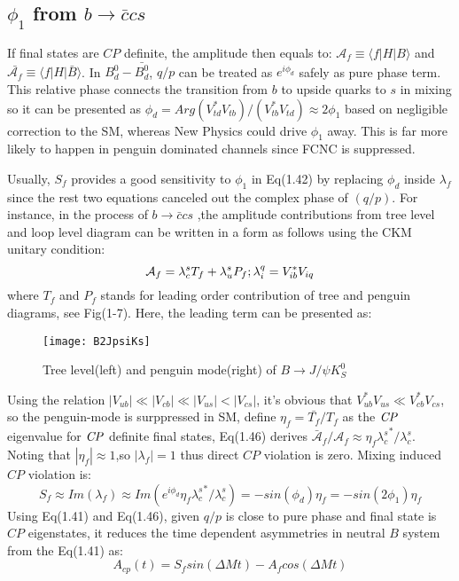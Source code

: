 \subsection{$\phi_1$  from $b\to \bar{c}cs$}
If final states are $CP$ definite, the amplitude then equals to: $\mathcal{A}_f \equiv \langle f|H|B\rangle$ and $\bar{\mathcal{A}_f} \equiv \langle f|H|\bar{B}\rangle$. In $B_d^0-\bar{B_d^0}$, $q/p$ can be treated as $e^{i\phi_d}$ safely as pure phase term. This relative phase connects the transition from $b$ to upside quarks to $s$ in mixing so it can be presented as $\phi_d = Arg(V^*_{td}V_{tb})/(V^*_{tb}V_{td}) \approx 2\phi_1 $ based on negligible correction to the SM, whereas New Physics could drive $\phi_1$ away. This is far more likely to happen in penguin dominated channels since FCNC is suppressed.

Usually, $S_f$ provides a good sensitivity to $\phi_1$ in Eq(1.42) by replacing $\phi_d$ inside $\lambda_f$ since the rest two equations canceled out the complex phase of $(q/p)$. For instance, in the process of  $b\to \bar{c}cs$ ,the amplitude contributions from tree level and loop level diagram can be written in a form as follows using the CKM unitary condition: 
\begin{equation}
\mathcal{A}_f= 
\lambda^s_c T_f + 
\lambda^s_u P_f; \\
\lambda^q_i = V^*_{ib}V_{iq}
\end{equation}
where $T_f$ and $P_f$ stands for leading order contribution of tree and penguin diagrams, see Fig(1-7). Here, the leading term can be presented as: 
\begin{figure}[htpb]
	\centering
	\texttt{[image: B2JpsiKs]}
	\caption{Tree level(left) and penguin mode(right) of $B\to J/\psi K_S^0$}
\end{figure}

Using the relation $|V_{ub}|\ll |V_{cb}|\ll|V_{us}|<|V_{cs}|$, it's obvious that $V^*_{ub}V_{us} \ll V^*_{cb}V_{cs}$, so the penguin-mode is surppressed in SM, define $\eta_f={\bar{T_f}}/{T_f}$ as the $\it{CP}$ eigenvalue for $\it{CP}$ definite final states, Eq(1.46) derives $\bar{\mathcal{A}}_f / \mathcal{A}_f \approx \eta_f {\lambda^{s}_c}^*/\lambda^{s}_c$. Noting that $|\eta_f|\approx1$,so $|\lambda_f|=1$ thus direct $CP$ violation is zero. Mixing induced $CP$ violation is:
\begin{equation}
S_f \approx Im(\lambda_f)\approx 
Im(e^{i\phi_d}\eta_f {\lambda^{s}_c}^*/\lambda^{s}_c)
=-sin(\phi_d)\eta_f=-sin(2\phi_1)\eta_f
\end{equation}
Using  Eq(1.41) and Eq(1.46), given $q/p$ is close to pure phase and final state is $CP$ eigenstates, it reduces the time dependent asymmetries in neutral $B$ system from the Eq(1.41) as: 
\begin{equation}
A_{cp}(t)=S_f sin(\Delta{M}t)-A_fcos(\Delta{M}t)
\end{equation}

